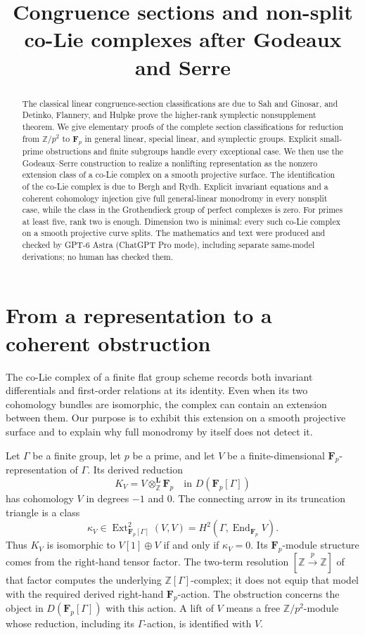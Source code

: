 \documentclass[11pt]{article}
\title{Congruence sections and non-split co-Lie complexes after Godeaux and Serre}
\author{}\date{}
\newcommand{\Fp}{\mathbf F_p}\newcommand{\OO}{\mathcal O}
\DeclareMathOperator{\End}{End}\DeclareMathOperator{\Hom}{Hom}
\DeclareMathOperator{\Ext}{Ext}\DeclareMathOperator{\Tor}{Tor}
\theoremstyle{definition}\newtheorem{definition}[theorem]{Definition}
\theoremstyle{remark}\newtheorem{remark}[theorem]{Remark}
\begin{document}
\maketitle
\begin{abstract}
The classical linear congruence-section classifications are due to Sah and Ginosar, and Detinko, Flannery, and Hulpke prove the higher-rank symplectic nonsupplement theorem. We give elementary proofs of the complete section classifications for reduction from $\mathbb Z/p^2$ to $\mathbf F_p$ in general linear, special linear, and symplectic groups. Explicit small-prime obstructions and finite subgroups handle every exceptional case. We then use the Godeaux--Serre construction to realize a nonlifting representation as the nonzero extension class of a co-Lie complex on a smooth projective surface. The identification of the co-Lie complex is due to Bergh and Rydh. Explicit invariant equations and a coherent cohomology injection give full general-linear monodromy in every nonsplit case, while the class in the Grothendieck group of perfect complexes is zero. For primes at least five, rank two is enough. Dimension two is minimal: every such co-Lie complex on a smooth projective curve splits. The mathematics and text were produced and checked by GPT-6 Astra (ChatGPT Pro mode), including separate same-model derivations; no human has checked them.
\end{abstract}

\section{From a representation to a coherent obstruction}

The co-Lie complex of a finite flat group scheme records both invariant differentials and first-order relations at its identity. Even when its two cohomology bundles are isomorphic, the complex can contain an extension between them. Our purpose is to exhibit this extension on a smooth projective surface and to explain why full monodromy by itself does not detect it.

Let $\Gamma$ be a finite group, let $p$ be a prime, and let $V$ be a finite-dimensional $\Fp$-representation of $\Gamma$. Its derived reduction
\[
 K_V=V\otimes^{\mathbf L}_{\mathbb Z}\Fp
       \quad\text{in }D(\Fp[\Gamma])
\]
has cohomology $V$ in degrees $-1$ and $0$. The connecting arrow in its truncation triangle is a class
\begin{equation}\label{eq:kappa}
 \kappa_V\in\Ext^2_{\Fp[\Gamma]}(V,V)
       =H^2(\Gamma,\End_{\Fp}V).
\end{equation}
Thus $K_V$ is isomorphic to $V[1]\oplus V$ if and only if $\kappa_V=0$. Its $\Fp$-module structure comes from the right-hand tensor factor. The two-term resolution $[\mathbb Z\xrightarrow{p}\mathbb Z]$ of that factor computes the underlying $\mathbb Z[\Gamma]$-complex; it does not equip that model with the required derived right-hand $\Fp$-action. The obstruction concerns the object in $D(\Fp[\Gamma])$ with this action. A lift of $V$ means a free $\mathbb Z/p^2$-module whose reduction, including its $\Gamma$-action, is identified with $V$.
\end{document}
